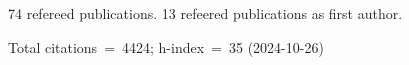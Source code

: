 74 refereed publications. 13 refeered publications as first author.

Total citations~=~4424; h-index~=~35 (2024-10-26)